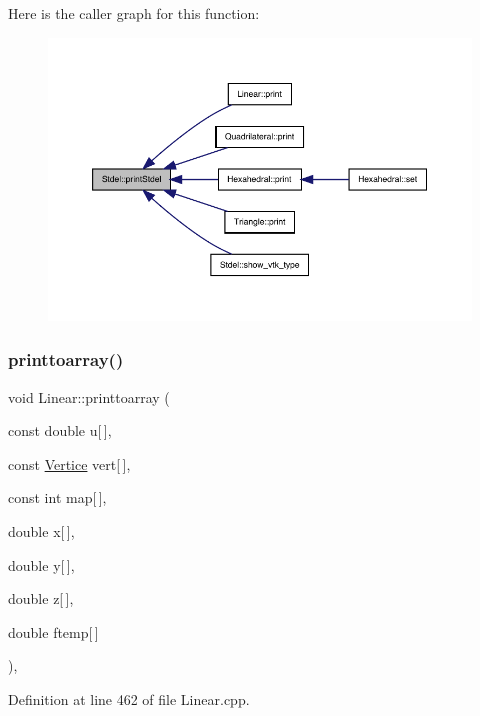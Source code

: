 Here is the caller graph for this function\+:
\nopagebreak
\begin{figure}[H]
\begin{center}
\leavevmode
\includegraphics[width=350pt]{classStdel_a54b5768d09f500cb949e66fc234eac70_icgraph}
\end{center}
\end{figure}
\mbox{\label{classLinear_a0fe2bfc35947baadac5f8b9c0cca5640}} 
\subsubsection{\texorpdfstring{printtoarray()}{printtoarray()}}
{\footnotesize\ttfamily void Linear\+::printtoarray (\begin{DoxyParamCaption}\item[{const double}]{u\mbox{[}$\,$\mbox{]},  }\item[{const \hyperlink{structVertice}{Vertice}}]{vert\mbox{[}$\,$\mbox{]},  }\item[{const int}]{map\mbox{[}$\,$\mbox{]},  }\item[{double}]{x\mbox{[}$\,$\mbox{]},  }\item[{double}]{y\mbox{[}$\,$\mbox{]},  }\item[{double}]{z\mbox{[}$\,$\mbox{]},  }\item[{double}]{ftemp\mbox{[}$\,$\mbox{]} }\end{DoxyParamCaption})\hspace{0.3cm}{\ttfamily [private]}, {\ttfamily [virtual]}}



Definition at line 462 of file Linear.\+cpp.



